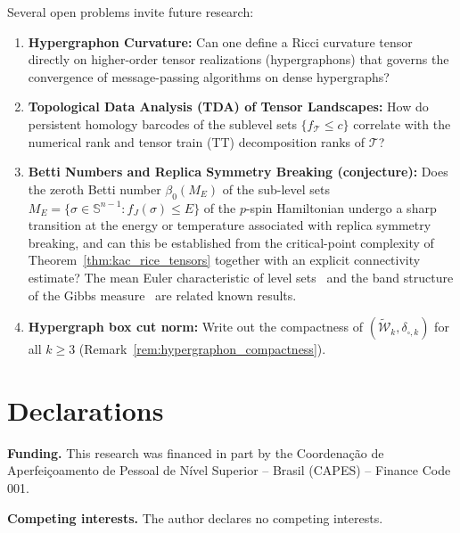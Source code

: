 \documentclass[11pt,a4paper,reqno]{amsart}
\theoremstyle{definition}
\numberwithin{equation}{section}
\newcommand{\Sph}{\mathbb{S}}
\begin{document}
Several open problems invite future research:
\begin{enumerate}
    \item \textbf{Hypergraphon Curvature:} Can one define a Ricci curvature tensor directly on higher-order tensor realizations (hypergraphons) that governs the convergence of message-passing algorithms on dense hypergraphs?
    \item \textbf{Topological Data Analysis (TDA) of Tensor Landscapes:} How do persistent homology barcodes of the sublevel sets $\{f_{\mathcal{T}} \le c\}$ correlate with the numerical rank and tensor train (TT) decomposition ranks of $\mathcal{T}$?
    \item \textbf{Betti Numbers and Replica Symmetry Breaking (conjecture):} Does the zeroth Betti number $\beta_0(M_E)$ of the sub-level sets $M_E = \{\sigma \in \Sph^{n-1} \colon f_J(\sigma) \le E\}$ of the $p$-spin Hamiltonian undergo a sharp transition at the energy or temperature associated with replica symmetry breaking, and can this be established from the critical-point complexity of Theorem~\ref{thm:kac_rice_tensors} together with an explicit connectivity estimate? The mean Euler characteristic of level sets~\cite{auffinger2013complexity} and the band structure of the Gibbs measure~\cite{subag2017geometry} are related known results.
    \item \textbf{Hypergraph box cut norm:} Write out the compactness of $(\widetilde{\mathcal{W}}_k, \delta_{\square,k})$ for all $k \ge 3$ (Remark~\ref{rem:hypergraphon_compactness}).
\end{enumerate}

\section*{Declarations}

\noindent\textbf{Funding.} This research was financed in part by the Coordena\c{c}\~ao de Aperfei\c{c}oamento de Pessoal de N\'ivel Superior -- Brasil (CAPES) -- Finance Code 001.

\medskip\noindent\textbf{Competing interests.} The author declares no competing interests.
\end{document}

